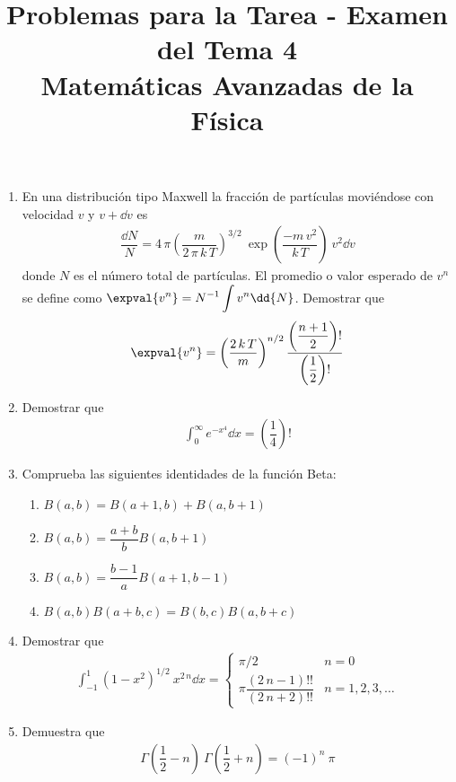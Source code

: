 
\usepackage{standalone}
\usepackage{enumerate}
\usepackage{hyperref}
\usepackage[left=1.5cm,top=1.5cm,right=1.5cm,bottom=1.5cm]{geometry}
\title{Problemas para la Tarea - Examen del Tema 4 \\ \large{Matemáticas Avanzadas de la Física} \vspace{-1.5\baselineskip}}
\date{ }

\vspace{-4cm}
\renewcommand\labelenumii{\theenumi.{\arabic{enumii})}}
\maketitle
\fontsize{14}{14}\selectfont
\begin{enumerate}
\item En una distribución tipo Maxwell la fracción de partículas moviéndose con velocidad $v$ y $v +\dd{v}$ es
\begin{align*}
\dfrac{\dd{N}}{N} = 4 \, \pi \left( \dfrac{m}{2 \, \pi \, k \, T} \right)^{3/2} \: \exp \left( \dfrac{-m \, v^{2}}{k \, T} \right) \: v^{2} \dd{v}
\end{align*}
donde $N$ es el número total de partículas. El promedio o valor esperado de $v^{n}$ se define como $\displaystyle \expval{v^{n}} = N^{-1} \int v^{n} \dd{N}$. Demostrar que
\begin{align*}
\expval{v^{n}} = \left( \dfrac{2 \, k \, T}{m} \right)^{n/2} \dfrac{\left( \dfrac{n + 1}{2} \right) !} { \left( \dfrac{1}{2} \right) !}
\end{align*}
\item Demostrar que
\begin{align*}
\int_{0}^{\infty} e^{-x^{4}} \dd{x} = \left( \dfrac{1}{4} \right) !
\end{align*}
\item Comprueba las siguientes identidades de la función Beta:
\begin{enumerate}
\setlength{\itemsep}{15pt}
\item $B(a, b) = B(a + 1, b) + B(a, b + 1)$
\item $B(a, b) = \dfrac{a + b}{b} B(a, b + 1)$ 
\item $B(a, b) = \dfrac{b - 1}{a} B(a + 1, b - 1)$
\item $B(a, b) B(a + b, c) = B(b, c) B(a, b + c)$
\end{enumerate}
\item Demostrar que
\begin{align*}
\int_{-1}^{1} (1-x^{2})^{1/2} \: x^{2 \, n} \dd{x} =  
\begin{cases}
\pi/2 & n = 0 \\[1em]
\pi \dfrac{(2 \, n - 1)!!}{(2 \, n + 2)!!} & n = 1,2,3,\ldots  \end{cases}
\end{align*} 
\item Demuestra que 
\begin{align*}
\Gamma \left( \dfrac{1}{2} - n \right) \: \Gamma \left( \dfrac{1}{2} + n \right) = (-1)^{n} \: \pi
\end{align*}
\end{enumerate}
